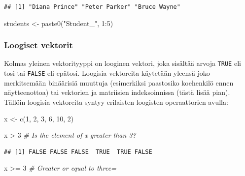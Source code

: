 \documentclass[
]{book}
\newenvironment{Shaded}{\begin{snugshade}}{\end{snugshade}}
\newcommand{\CommentTok}[1]{\textcolor[rgb]{0.56,0.35,0.01}{\textit{#1}}}
\newcommand{\DecValTok}[1]{\textcolor[rgb]{0.00,0.00,0.81}{#1}}
\newcommand{\FunctionTok}[1]{\textcolor[rgb]{0.00,0.00,0.00}{#1}}
\newcommand{\NormalTok}[1]{#1}
\newcommand{\OtherTok}[1]{\textcolor[rgb]{0.56,0.35,0.01}{#1}}
\newcommand{\SpecialCharTok}[1]{\textcolor[rgb]{0.00,0.00,0.00}{#1}}
\newcommand{\StringTok}[1]{\textcolor[rgb]{0.31,0.60,0.02}{#1}}
\begin{document}
\begin{verbatim}
## [1] "Diana Prince" "Peter Parker" "Bruce Wayne"
\end{verbatim}

\begin{Shaded}
\begin{Highlighting}[]
\NormalTok{students }\OtherTok{\textless{}{-}} \FunctionTok{paste0}\NormalTok{(}\StringTok{"Student\_"}\NormalTok{, }\DecValTok{1}\SpecialCharTok{:}\DecValTok{5}\NormalTok{)}
\end{Highlighting}
\end{Shaded}

\hypertarget{loogiset-vektorit}{%
\subsubsection{Loogiset vektorit}\label{loogiset-vektorit}}

Kolmas yleinen vektorityyppi on looginen vektori, joka sisältää arvoja \texttt{TRUE} eli tosi tai \texttt{FALSE} eli epätosi. Loogisia vektoreita käytetään yleensä joko merkitsemään binäärisiä muuttuja (esimerkiksi paastosiko koehenkilö ennen näytteenottoa) tai vektorien ja matriisien indeksoinnissa (tästä lisää pian). Tällöin loogisia vektoreita syntyy erilaisten loogisten operaattorien avulla:

\begin{Shaded}
\begin{Highlighting}[]
\NormalTok{x }\OtherTok{\textless{}{-}} \FunctionTok{c}\NormalTok{(}\DecValTok{1}\NormalTok{, }\DecValTok{2}\NormalTok{, }\DecValTok{3}\NormalTok{, }\DecValTok{6}\NormalTok{, }\DecValTok{10}\NormalTok{, }\DecValTok{2}\NormalTok{)}

\NormalTok{x }\SpecialCharTok{\textgreater{}} \DecValTok{3} \CommentTok{\# Is the element of x greater than 3?}
\end{Highlighting}
\end{Shaded}

\begin{verbatim}
## [1] FALSE FALSE FALSE  TRUE  TRUE FALSE
\end{verbatim}

\begin{Shaded}
\begin{Highlighting}[]
\NormalTok{x }\SpecialCharTok{\textgreater{}=} \DecValTok{3} \CommentTok{\# Greater or equal to three=}
\end{Highlighting}
\end{Shaded}
\end{document}
